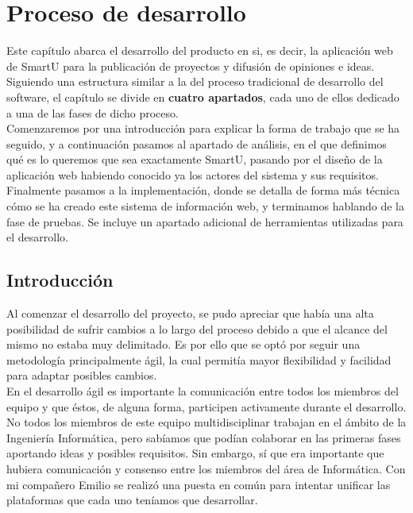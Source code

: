 \chapter{Proceso de desarrollo}
Este capítulo abarca el desarrollo del producto en si, es decir, la aplicación web de SmartU para la publicación de proyectos y difusión de opiniones e ideas. Siguiendo una estructura similar a la del proceso tradicional de desarrollo del software, el capítulo se divide en \textbf{cuatro apartados}, cada uno de ellos dedicado a una de las fases de dicho proceso.\\

Comenzaremos por una introducción para explicar la forma de trabajo que se ha seguido, y a continuación pasamos al apartado de análisis, en el que definimos qué es lo queremos que sea exactamente SmartU, pasando por el diseño de la aplicación web habiendo conocido ya los actores del sistema y sus requisitos.\\

Finalmente pasamos a la implementación, donde se detalla de forma más técnica cómo se ha creado este sistema de información web, y terminamos hablando de la fase de pruebas. Se incluye un apartado adicional de herramientas utilizadas para el desarrollo.

\section{Introducción}
Al comenzar el desarrollo del proyecto, se pudo apreciar que había una alta posibilidad de sufrir cambios a lo largo del proceso debido a que el alcance del mismo no estaba muy delimitado. Es por ello que se optó por seguir una metodología principalmente ágil, la cual permitía mayor flexibilidad y facilidad para adaptar posibles cambios.\\

En el desarrollo ágil es importante la comunicación entre todos los miembros del equipo y que éstos, de alguna forma, participen activamente durante el desarrollo. No todos los miembros de este equipo multidisciplinar trabajan en el ámbito de la Ingeniería Informática, pero sabíamos que podían colaborar en las primeras fases aportando ideas y posibles requisitos. Sin embargo, sí que era importante que hubiera comunicación y consenso entre los miembros del área de Informática. Con mi compañero Emilio se realizó una puesta en común para intentar unificar las plataformas que cada uno teníamos que desarrollar.\\

